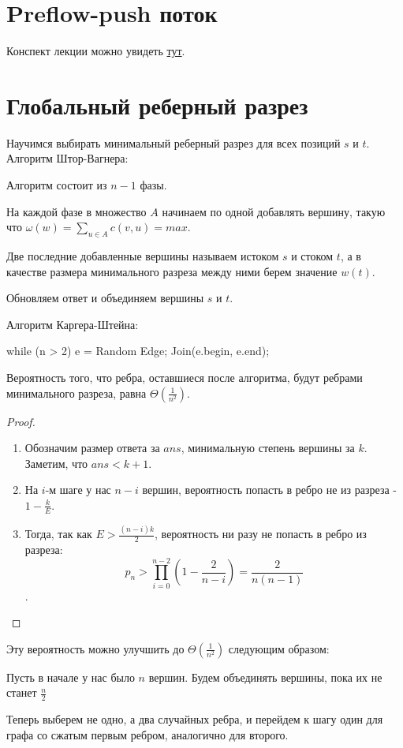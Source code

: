 
\section{Preflow-push поток}
Конспект лекции можно увидеть \href{http://acm.math.spbu.ru/~sk1/mm/lections/2015-04-08-preflow-push-2.pdf}{тут}.

\section{Глобальный реберный разрез}

Научимся выбирать минимальный реберный разрез для всех позиций $s$ и $t$. 
Алгоритм Штор-Вагнера:
\begin{description}
\item Алгоритм состоит из $n - 1$ фазы.
\item На каждой фазе в множество $A$ начинаем по одной добавлять вершину, такую что $ \omega(w) = \sum_{u \in A} c(v, u) = max$.
\item Две последние добавленные вершины называем истоком $s$ и стоком $t$, а в качестве размера минимального разреза между ними берем значение $w(t)$.
\item Обновляем ответ и объединяем вершины $s$ и $t$.  
\end{description}

Алгоритм Каргера-Штейна:
\begin{cppcode}
while (n > 2) {
	e = Random Edge;
	Join(e.begin, e.end);
}
\end{cppcode}

\begin{assertion}
Вероятность того, что ребра, оставшиеся после алгоритма, будут ребрами минимального разреза, равна $\Theta(\frac{1}{n^2})$.
\end{assertion}

\begin{proof}
\begin{enumerate}
\item Обозначим размер ответа за $ans$, минимальную степень вершины за $k$. Заметим, что $ans < k + 1$.
\item На $i$-м шаге у нас $n - i$ вершин, вероятность попасть в ребро не из разреза - $1 - \frac{k}{E}$.
\item Тогда, так как $E > \frac{(n - i)k}{2}$, вероятность ни разу не попасть в ребро из разреза:
$$p_n > \prod_{i = 0}^{n - 2} (1 - \frac{2}{n - i})  = \frac{2}{n(n - 1)}$$. 
\end{enumerate}
\end{proof}

Эту вероятность можно улучшить до $\Theta(\frac{1}{n^2})$ следующим образом:
\begin{description}
\item Пусть в начале у нас было $n$ вершин. Будем объединять вершины, пока их не станет $\frac{n}{2}$ 
\item Теперь выберем не одно, а два случайных ребра, и перейдем к шагу один для графа со сжатым первым ребром, аналогично для второго.
\end{description}

